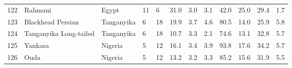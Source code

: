 \begin{center}
\begin{landscape}
\begin{longtable}{|p{0.4in}|p{0.9in}|p{0.7in}|p{0.4in}|p{0.45in}|p{0.45in}|p{0.45in}|p{0.45in}|p{0.45in}|p{0.45in}|p{0.45in}|p{0.45in}|}
 122 &  Rahmani &  Egypt & 11 &  6 & 31.0 & 3.0 & 3.1 & 42.0 & 25.0 & 29.4 & 1.7 \\ 
 123 &  Blackhead Persian &  Tanganyika &  6 &  18 & 19.9 & 3.7 & 4.6 & 80.5 & 14.0 & 25.9 & 5.8 \\ 
 124 &  Tanganyika Long-tailed &  Tanganyika &  6 &  18 & 10.7 & 3.3 & 2.1 & 74.6 & 13.1 & 32.8 & 5.7 \\ 
 125 &  Yankasa &  Nigeria &  5 &  12 & 16.1 & 3.4 & 3.9 & 93.8 & 17.6 & 34.2 & 5.7 \\ 
 126 &  Ouda &  Nigeria &  5 &  12 & 13.2 & 3.2 & 3.3 & 85.2 & 15.6 & 31.9 & 5.5 \\ 
   \hline

\end{longtable}
\end{landscape}
\end{center}
%

